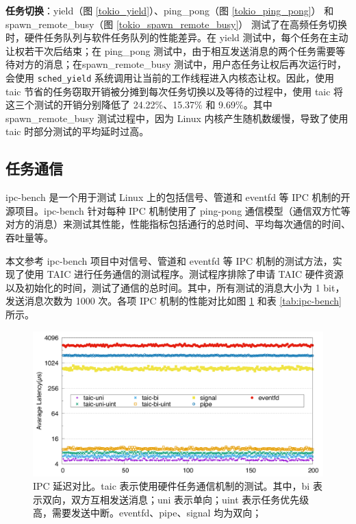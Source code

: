 \textbf{任务切换}：yield（图 \ref{tokio_yield}）、ping\_pong（图 \ref{tokio_ping_pong}） 和 spawn\_remote\_busy（图 \ref{tokio_spawn_remote_busy}） 测试了在高频任务切换时，硬件任务队列与软件任务队列的性能差异。在 yield 测试中，每个任务在主动让权若干次后结束；在 ping\_pong 测试中，由于相互发送消息的两个任务需要等待对方的消息；在spawn\_remote\_busy 测试中，用户态任务让权后再次运行时，会使用 \verb|sched_yield| 系统调用让当前的工作线程进入内核态让权。因此，使用 taic 节省的任务窃取开销被分摊到每次任务切换以及等待的过程中，使用 taic 将这三个测试的开销分别降低了 24.22\%、15.37\% 和 9.69\%。其中 spawn\_remote\_busy 测试过程中，因为 Linux 内核产生随机数缓慢，导致了使用 taic 时部分测试的平均延时过高。

\subsection{任务通信}

ipc-bench \cite{ipc-bench_2025} 是一个用于测试 Linux 上的包括信号、管道和 eventfd 等 IPC 机制的开源项目。ipc-bench 针对每种 IPC 机制使用了 ping-pong 通信模型（通信双方忙等对方的消息）来测试其性能，性能指标包括通行的总时间、平均每次通信的时间、吞吐量等。

本文参考 ipc-bench 项目中对信号、管道和 eventfd 等 IPC 机制的测试方法，实现了使用 TAIC 进行任务通信的测试程序。测试程序排除了申请 TAIC 硬件资源以及初始化的时间，测试了通信的总时间。其中，所有测试的消息大小为 1 bit，发送消息次数为 1000 次。各项 IPC 机制的性能对比如图 \ref{figure:ipc-bench} 和表 \ref{tab:ipc-bench} 所示。

\begin{figure}
    \centering
    \includegraphics[width=\textwidth]{figures/pdfs/taic-ipc.pdf}
    \caption[IPC 延迟对比]{IPC 延迟对比。taic 表示使用硬件任务通信机制的测试。其中，bi 表示双向，双方互相发送消息；uni 表示单向；uint 表示任务优先级高，需要发送中断。eventfd、pipe、signal 均为双向；}
    \label{figure:ipc-bench}
\end{figure}


